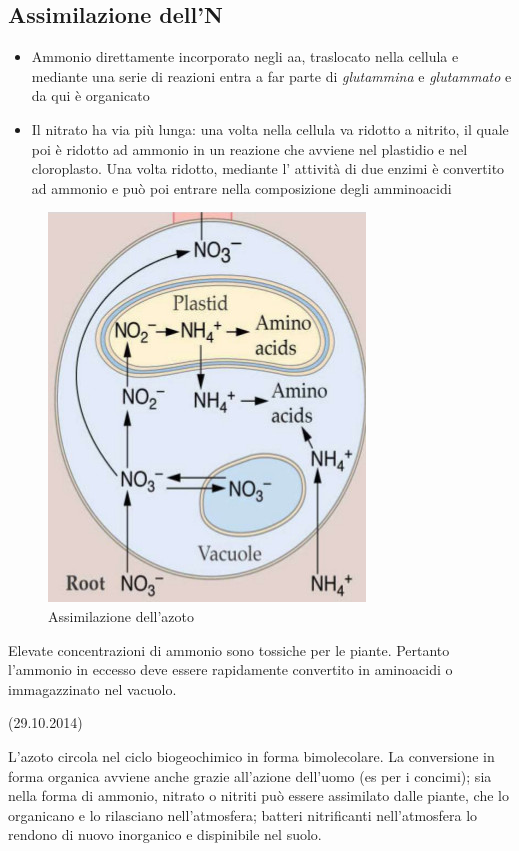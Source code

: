 \documentclass[a4paper,12pt]{book}
\begin{document}
\subsection{Assimilazione dell'N}
\begin{itemize}
\item{Ammonio direttamente incorporato negli aa, traslocato nella cellula e mediante una serie di reazioni entra a far parte di \emph{glutammina} e \emph{glutammato} e da qui è organicato} 
\item{Il nitrato ha via più lunga: una volta nella cellula va ridotto a nitrito, il quale poi è ridotto ad ammonio in un reazione che avviene nel plastidio e nel cloroplasto. Una volta ridotto, mediante l' attività di due enzimi è convertito ad ammonio e può poi entrare nella composizione degli amminoacidi}
\end{itemize} 
 \begin{figure}[H]
\centering
\includegraphics[scale=0.35]{immagini/azoto.jpg}
\caption{Assimilazione dell'azoto}
\end{figure}
 
Elevate concentrazioni di ammonio sono tossiche per le piante. Pertanto l’ammonio in eccesso deve essere rapidamente convertito in aminoacidi o immagazzinato nel vacuolo. 
 
  
(29.10.2014)

L'azoto circola nel ciclo biogeochimico in forma bimolecolare.
La conversione in forma organica avviene anche grazie all'azione dell'uomo (es per i concimi); sia nella forma di ammonio, nitrato o nitriti può essere assimilato dalle piante, che lo organicano e lo rilasciano nell'atmosfera; batteri nitrificanti nell'atmosfera lo rendono di nuovo inorganico e dispinibile nel suolo.
\end{document}
